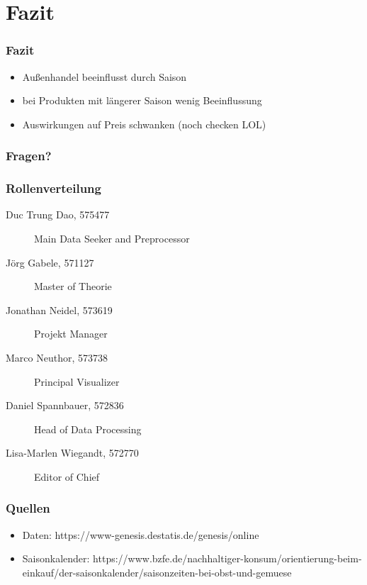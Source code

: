 \documentclass{beamer}
\begin{document}
\section{Fazit}
\begin{frame}
	\frametitle{Fazit}
	\begin{itemize}
		\item Außenhandel beeinflusst durch Saison
		\item bei Produkten mit längerer Saison wenig Beeinflussung
		\item Auswirkungen auf Preis schwanken (noch checken LOL)
	\end{itemize}
\end{frame}

\begin{frame}
  \frametitle{Fragen?}

  \begin{figure}[h]
    \centering
  \end{figure}
\end{frame}

\begin{frame}
	\frametitle{Rollenverteilung}
	\begin{description}
		\item[Duc Trung Dao, 575477]Main Data Seeker and Preprocessor
		\item[Jörg Gabele, 571127]Master of Theorie
		\item[Jonathan Neidel, 573619]Projekt Manager
		\item[Marco Neuthor, 573738]Principal Visualizer
		\item[Daniel Spannbauer, 572836]Head of Data Processing
		\item[Lisa-Marlen Wiegandt, 572770]Editor of Chief
	\end{description}
\end{frame}

\begin{frame}
  \frametitle{Quellen}

  \begin{itemize}
    \item Daten: https://www-genesis.destatis.de/genesis/online
    \item Saisonkalender: https://www.bzfe.de/nachhaltiger-konsum/orientierung-beim-einkauf/der-saisonkalender/saisonzeiten-bei-obst-und-gemuese
  \end{itemize}

\end{frame}
\end{document}
